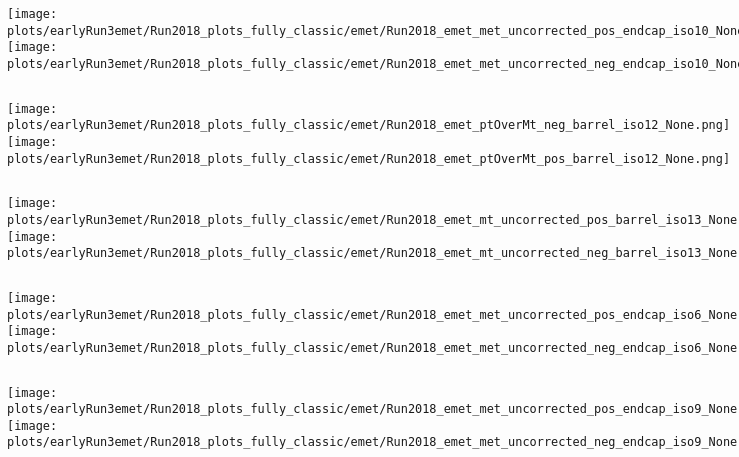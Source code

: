 \documentclass[en,16:9,navbarinfooter]{presentation/sdqbeamer}
\begin{document}
\begin{frame}{\insertsubsection}
   \begin{columns}
   \texttt{[image: plots/earlyRun3emet/Run2018\_plots\_fully\_classic/emet/Run2018\_emet\_met\_uncorrected\_pos\_endcap\_iso10\_None.png]}
   \texttt{[image: plots/earlyRun3emet/Run2018\_plots\_fully\_classic/emet/Run2018\_emet\_met\_uncorrected\_neg\_endcap\_iso10\_None.png]}
\end{columns}
\end{frame}

\begin{frame}{\insertsubsection}
   \begin{columns}
   \texttt{[image: plots/earlyRun3emet/Run2018\_plots\_fully\_classic/emet/Run2018\_emet\_ptOverMt\_neg\_barrel\_iso12\_None.png]}
   \texttt{[image: plots/earlyRun3emet/Run2018\_plots\_fully\_classic/emet/Run2018\_emet\_ptOverMt\_pos\_barrel\_iso12\_None.png]}
\end{columns}
\end{frame}

\begin{frame}{\insertsubsection}
   \begin{columns}
   \texttt{[image: plots/earlyRun3emet/Run2018\_plots\_fully\_classic/emet/Run2018\_emet\_mt\_uncorrected\_pos\_barrel\_iso13\_None.png]}
   \texttt{[image: plots/earlyRun3emet/Run2018\_plots\_fully\_classic/emet/Run2018\_emet\_mt\_uncorrected\_neg\_barrel\_iso13\_None.png]}
\end{columns}
\end{frame}

\begin{frame}{\insertsubsection}
   \begin{columns}
   \texttt{[image: plots/earlyRun3emet/Run2018\_plots\_fully\_classic/emet/Run2018\_emet\_met\_uncorrected\_pos\_endcap\_iso6\_None.png]}
   \texttt{[image: plots/earlyRun3emet/Run2018\_plots\_fully\_classic/emet/Run2018\_emet\_met\_uncorrected\_neg\_endcap\_iso6\_None.png]}
\end{columns}
\end{frame}

\begin{frame}{\insertsubsection}
   \begin{columns}
   \texttt{[image: plots/earlyRun3emet/Run2018\_plots\_fully\_classic/emet/Run2018\_emet\_met\_uncorrected\_pos\_endcap\_iso9\_None.png]}
   \texttt{[image: plots/earlyRun3emet/Run2018\_plots\_fully\_classic/emet/Run2018\_emet\_met\_uncorrected\_neg\_endcap\_iso9\_None.png]}
\end{columns}
\end{frame}
\end{document}
